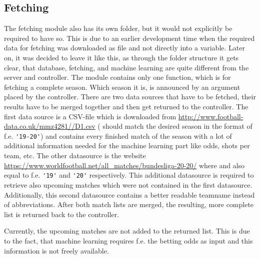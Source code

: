 \subsection{Fetching}
The fetching module also has its own folder, but it would not explicitly be required to have so. This is due to an earlier development time when the required data for fetching was downloaded as file and not directly into a variable. Later on, it was decided to leave it like this, as through the folder structure it gets clear, that database, fetching, and machine learning are quite different from the server and controller. The module contains only one function, which is for fetching a complete season. Which season it is, is announced by an argument placed by the controller. There are two data sources that have to be fetched, their results have to be merged together and then get returned to the controller. The first data source is a CSV-file which is downloaded from \url{http://www.football-data.co.uk/mmz4281//D1.csv} (\lstinline[columns=fixed]{} should match the desired season in the format of f.e. \lstinline[columns=fixed]{'19-20'}) and contains every finished match of the season with a lot of additional information needed for the machine learning part like odds, shots per team, etc.
The other datasource is the website \url{https://www.worldfootball.net/all_matches/bundesliga-20-20/} where \lstinline[columns=fixed]{} and \lstinline[columns=fixed]{} also equal to f.e. \lstinline[columns=fixed]{'19'} and \lstinline[columns=fixed]{'20'} respectively. This additional datasource is required to retrieve also upcoming matches which were not contained in the first datasource. Additionally, this second datasource contains a better readable teamname instead of abbreviations.
After both match lists are merged, the resulting, more complete list is returned back to the controller.

Currently, the upcoming matches are not added to the returned list. This is due to the fact, that machine learning requires f.e. the betting odds as input and this information is not freely available. %

